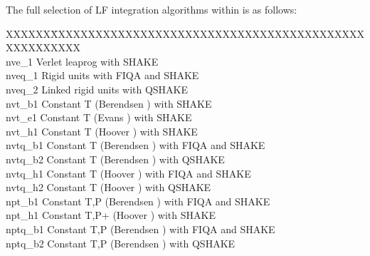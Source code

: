 The full selection of LF integration algorithms within \D{} is
as follows:

\begin{tabbing}
XXXXXX\=XXXXXXXXXXXXXXXXXXXXXXXXXXXXXXXXXXXXXXXXXXXXXXXXXXXX\kill\\
{\sc nve\_1}    \>  Verlet leaprog with SHAKE \\
{\sc nveq\_1}   \>  Rigid units with FIQA and SHAKE\\
{\sc nveq\_2}   \>  Linked rigid units with QSHAKE \\
{\sc nvt\_b1}   \>  Constant T (Berendsen \cite{berendsen-84a}) with SHAKE \\
{\sc nvt\_e1}   \>  Constant T (Evans \cite{evans-84a}) with SHAKE \\
{\sc nvt\_h1}   \>  Constant T (Hoover \cite{hoover-85a}) with SHAKE \\
{\sc nvtq\_b1}  \>  Constant T (Berendsen \cite{berendsen-84a}) with FIQA and SHAKE \\
{\sc nvtq\_b2}  \>  Constant T (Berendsen \cite{berendsen-84a}) with QSHAKE \\
{\sc nvtq\_h1}  \>  Constant T (Hoover \cite{hoover-85a}) with FIQA and SHAKE \\
{\sc nvtq\_h2}  \>  Constant T (Hoover \cite{hoover-85a}) with QSHAKE \\
{\sc npt\_b1}   \>  Constant T,P (Berendsen \cite{berendsen-84a}) with FIQA and SHAKE \\
{\sc npt\_h1}   \>  Constant T,P+ (Hoover \cite{hoover-85a}) with SHAKE \\
{\sc nptq\_b1}  \>  Constant T,P (Berendsen \cite{berendsen-84a}) with FIQA and SHAKE\\
{\sc nptq\_b2}  \>  Constant T,P (Berendsen \cite{berendsen-84a}) with QSHAKE \\

\end{tabbing}
